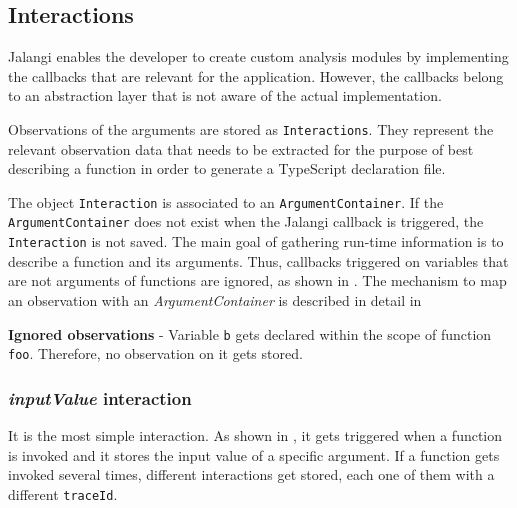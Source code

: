 \subsection{Interactions} \label{sec:run-time-interactions}
Jalangi enables the developer to create custom analysis modules by implementing the callbacks that are relevant for the application. However, the callbacks belong to an abstraction layer that is not aware of the actual implementation. 

Observations of the arguments are stored as \texttt{Interactions}. They represent the relevant observation data that needs to be extracted for the purpose of best describing a function in order to generate a TypeScript declaration file.

The object \texttt{Interaction} is associated to an \texttt{ArgumentContainer}. If the \texttt{ArgumentContainer} does not exist when the Jalangi callback is triggered, the \texttt{Interaction} is not saved. The main goal of gathering run-time information is to describe a function and its arguments. Thus, callbacks triggered on variables that are not arguments of functions are ignored, as shown in . The mechanism to map an observation with an \textit{ArgumentContainer} is described in detail in 

\begin{code}
  \caption[Ignored observations]{\textbf{Ignored observations} - Variable \texttt{b} gets declared within the scope of function \texttt{foo}. Therefore, no observation on it gets stored.}
  \label{code:ignored-observations}
\end{code}

\subsubsection{\textit{inputValue} interaction}
It is the most simple interaction. As shown in , it gets triggered when a function is invoked and it stores the input value of a specific argument. If a function gets invoked several times, different interactions get stored, each one of them with a different \texttt{traceId}.



